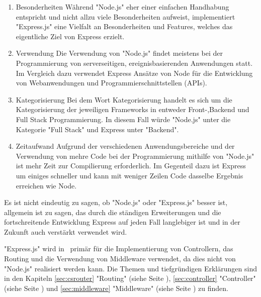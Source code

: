 \begin{enumerate}
    \item Besonderheiten
    \newline
    Während "Node.js" eher einer einfachen Handhabung entspricht und nicht allzu viele Besonderheiten aufweist, implementiert "Express.js" eine Vielfalt an Besonderheiten und Features, welches das eigentliche Ziel von Express erzielt. \cite{NodeExp}
    \item Verwendung
    \newline
    Die Verwendung von "Node.js" findet meistens bei der Programmierung von serverseitigen, ereignisbasierenden Anwendungen statt. Im Vergleich dazu verwendet Express Ansätze von Node für die Entwicklung von Webanwendungen und Programmierschnittstellen (APIs). \cite{NodeExp}
    \item Kategorisierung
    \newline
    Bei dem Wort Kategorisierung handelt es sich um die Kategorisierung der jeweiligen Frameworks in entweder Front-,Backend und Full Stack Programmierung. In diesem Fall würde "Node.js" unter die Kategorie "Full Stack" und Express unter "Backend". \cite{NodeExp}
    \item Zeitaufwand
    \newline
    Aufgrund der verschiedenen Anwendungsbereiche und der Verwendung von mehre Code bei der Programmierung mithilfe von "Node.js" ist mehr Zeit zur Compilierung erforderlich. Im Gegenteil dazu ist Express um einiges schneller und kann mit weniger Zeilen Code dasselbe Ergebnis erreichen wie Node. \cite{NodeExp}
\end{enumerate} 

Es ist nicht eindeutig zu sagen, ob "Node.js" oder "Express.js" besser ist, allgemein ist zu sagen, das durch die ständigen Erweiterungen und die fortschreitende Entwicklung Express auf jeden Fall langlebiger ist und in der Zukunft auch verstärkt verwendet wird. \cite{NodeExp}

"Express.js" wird in \ZELIA\ primär für die Implementierung von Controllern, das Routing und die Verwendung von Middleware verwendet, da dies nicht von "Node.js" realisiert werden kann. Die Themen und tiefgründigen Erklärungen sind in den Kapiteln \ref{sec:csrouter} "Routing" (siehe Seite \pageref{sec:csrouter}), \ref{sec:controller} "Controller" (siehe Seite \pageref{sec:controller}) und \ref{sec:middleware} "Middleware" (siehe Seite \pageref{sec:middleware}) zu finden. \cite{NodeExp}
